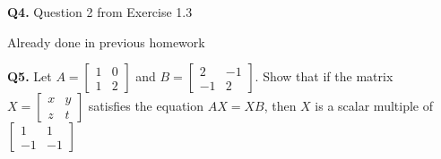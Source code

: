 \documentclass[addpoints]{exam}
\begin{document}
\begin{sloppypar}
\begin{questions}
    \question
    \textbf{Q4. } Question 2 from Exercise 1.3 
    \begin{solution}
        Already done in previous homework
    \end{solution}
    \pagebreak
    \question
    \textbf{Q5. } Let $ A = \begin{bmatrix}
        1 & 0 \\ 1 & 2
    \end{bmatrix} $ and $ B = \begin{bmatrix}
        2 & -1 \\ -1 & 2
    \end{bmatrix} $. Show that if the matrix $ X = \begin{bmatrix}
        x & y \\ z & t
    \end{bmatrix} $ satisfies the equation $ AX = XB $, then $X$ is a scalar multiple of $ \begin{bmatrix}
        1 & 1 \\ -1 & -1
    \end{bmatrix} $
\end{questions}
\end{sloppypar}
\end{document}

